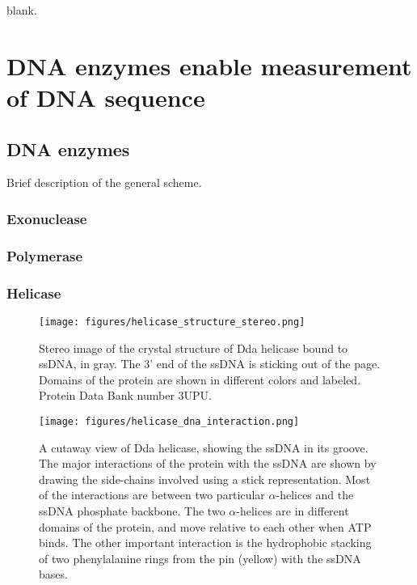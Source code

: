 \begin{savequote}[75mm]
blank.
\end{savequote}

\chapter{DNA enzymes enable measurement of DNA sequence}
\label{dna_enzymes}

\section{DNA enzymes}

Brief description of the general scheme.

\subsection{Exonuclease}

\subsection{Polymerase}

\subsection{Helicase}

\begin{figure}[h]
\begin{centering}
\texttt{[image: figures/helicase\_structure\_stereo.png]}
\caption[Dda helicase structure]{Stereo image of the crystal structure of Dda helicase bound to ssDNA, in gray.  The 3' end of the ssDNA is sticking out of the page.  Domains of the protein are shown in different colors and labeled.  Protein Data Bank number 3UPU. \citep{He2012}}
\label{fig:helicase_stereo}
\end{centering}
\end{figure}

\begin{figure}[h]
\begin{centering}
\texttt{[image: figures/helicase\_dna\_interaction.png]}
\caption[Dda helicase: interactions with ssDNA]{A cutaway view of Dda helicase, showing the ssDNA in its groove.  The major interactions of the protein with the ssDNA are shown by drawing the side-chains involved using a stick representation.  Most of the interactions are between two particular $\alpha$-helices and the ssDNA phosphate backbone.  The two $\alpha$-helices are in different domains of the protein, and move relative to each other when ATP binds.  The other important interaction is the hydrophobic stacking of two phenylalanine rings from the pin (yellow) with the ssDNA bases.}
\label{fig:helicase_ssDNA_interactions}
\end{centering}
\end{figure}

